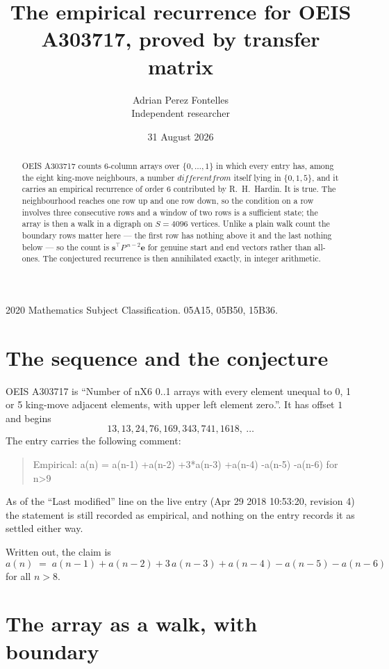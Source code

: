 \documentclass[11pt,a4paper]{article}
\title{The empirical recurrence for OEIS A303717, proved by transfer matrix}
\author{Adrian Perez Fontelles\\ \small Independent researcher}
\date{31 August 2026}
\theoremstyle{plain}
\theoremstyle{definition}
\begin{document}
\maketitle

\begin{abstract}
OEIS A303717 counts $6$-column arrays over $\{0,\dots,1\}$ in which every entry has,
among the eight king-move neighbours, a number $different from$ itself lying in $\{0,1,5\}$, and it carries an empirical
recurrence of order $6$ contributed by R.~H.~Hardin. It is true. The neighbourhood
reaches one row up and one row down, so the condition on a row involves three consecutive
rows and a window of two rows is a sufficient state; the array is then a walk in a digraph
on $S=4096$ vertices. Unlike a plain walk count the boundary rows matter here --- the first
row has nothing above it and the last nothing below --- so the count is
$\mathbf{s}^{\!\top}P^{\,n-2}\mathbf{e}$ for genuine start and end vectors rather than
all-ones. The conjectured recurrence is then annihilated exactly, in integer arithmetic.
\end{abstract}

\noindent\small 2020 Mathematics Subject Classification. 05A15, 05B50, 15B36.\normalsize

\section{The sequence and the conjecture}

OEIS A303717 is ``Number of nX6 0..1 arrays with every element unequal to 0, 1 or 5 king-move adjacent elements, with upper left element zero.''. It has offset
$1$ and begins
\[
13, 13, 24, 76, 169, 343, 741, 1618,\ \dots
\]
The entry carries the following comment:
\begin{quote}\small
Empirical: a(n) = a(n-1) +a(n-2) +3*a(n-3) +a(n-4) -a(n-5) -a(n-6) for n>9
\end{quote}
As of the ``Last modified'' line on the live entry (Apr 29 2018 10:53:20, revision
4) the statement is still recorded as empirical, and nothing on the entry
records it as settled either way.

Written out, the claim is
\begin{equation}\label{eq:conj}
a(n)\;=\;a(n-1) + a(n-2) + 3\,a(n-3) + a(n-4) - a(n-5) - a(n-6)
\end{equation}
for all $n>8$.

\section{The array as a walk, with boundary}
\end{document}
